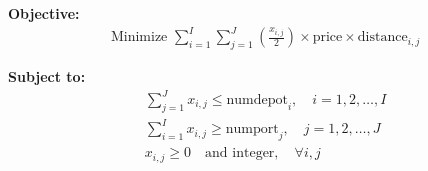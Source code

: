 \documentclass{article}
\begin{document}
\textbf{Objective:}
\begin{align*}
& \text{Minimize } \sum_{i=1}^{I} \sum_{j=1}^{J} \left(\frac{x_{i,j}}{2}\right) \times \text{price} \times \text{distance}_{i,j}
\end{align*}

\textbf{Subject to:}
\begin{align*}
& \sum_{j=1}^{J} x_{i,j} \leq \text{numdepot}_{i}, \quad i = 1, 2, \ldots, I \\
& \sum_{i=1}^{I} x_{i,j} \geq \text{numport}_{j}, \quad j = 1, 2, \ldots, J \\
& x_{i,j} \geq 0 \quad \text{and integer}, \quad \forall i, j
\end{align*}
\end{document}
